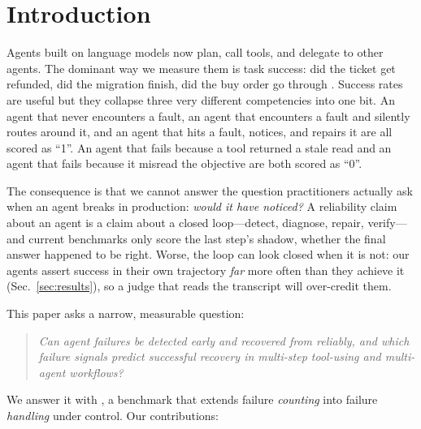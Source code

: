 \section{Introduction}

Agents built on language models now plan, call tools, and delegate to other agents. The dominant
way we measure them is task success: did the ticket get refunded, did the migration finish, did the
buy order go through \citep{yao2024taubench,liu2023agentbench,zhou2023webarena}. Success rates are
useful but they collapse three very different competencies into one bit. An agent that never
encounters a fault, an agent that encounters a fault and silently routes around it, and an agent
that hits a fault, notices, and repairs it are all scored as ``1''. An agent that fails because a
tool returned a stale read and an agent that fails because it misread the objective are both
scored as ``0''.

The consequence is that we cannot answer the question practitioners actually ask when an agent
breaks in production: \emph{would it have noticed?} A reliability claim about an agent is a claim
about a closed loop---detect, diagnose, repair, verify---and current benchmarks only score the last
step's shadow, whether the final answer happened to be right. Worse, the loop can look closed when
it is not: our agents assert success in their own trajectory \emph{far} more often than they
achieve it (Sec.~\ref{sec:results}), so a judge that reads the transcript will over-credit them.

This paper asks a narrow, measurable question:

\begin{quote}\itshape
Can agent failures be detected early and recovered from reliably, and which failure signals predict
successful recovery in multi-step tool-using and multi-agent workflows?
\end{quote}

\noindent We answer it with \arb{}, a benchmark that extends failure \emph{counting} into failure
\emph{handling} under control. Our contributions:

